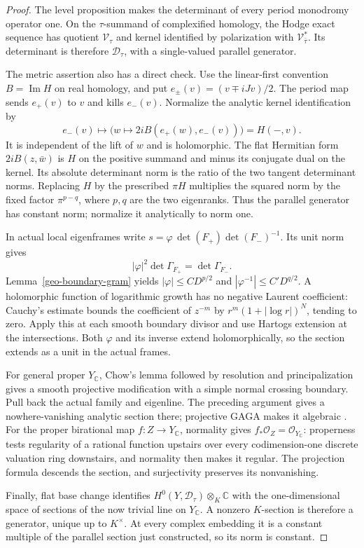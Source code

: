 \begin{proof}
The level proposition makes the determinant of every period
monodromy operator one. On the $\tau$-summand of complexified
homology, the Hodge exact sequence has quotient $\mathcal V_\tau$
and kernel identified by polarization with
$\mathcal V_{\bar\tau}^*$. Its determinant is therefore
$\mathcal D_\tau$, with a single-valued parallel generator.

The metric assertion also has a direct check. Use the
linear-first convention $B=\operatorname{Im}H$ on real homology,
and put $e_\pm(v)=(v\mp iJv)/2$. The period map sends $e_+(v)$
to $v$ and kills $e_-(v)$. Normalize the analytic kernel
identification by
\[
 e_-(v)\longmapsto
       \bigl(w\longmapsto 2iB(e_+(w),e_-(v))\bigr)=H(-,v).
\]
It is independent of the lift of $w$ and is holomorphic.
The flat Hermitian form $2iB(z,\bar w)$ is $H$ on the
positive summand and minus its conjugate dual on the kernel.
Its absolute determinant norm is the ratio of the two tangent
determinant norms. Replacing $H$ by the prescribed $\pi H$
multiplies the squared norm by the fixed factor $\pi^{p-q}$,
where $p,q$ are the two eigenranks. Thus the parallel generator
has constant norm; normalize it analytically to norm one.

In actual local eigenframes write
$s=\varphi\,\det(F_+)\det(F_-)^{-1}$. Its unit norm gives
\[
       |\varphi|^2\det\Gamma_{F_+}=\det\Gamma_{F_-}.
\]
Lemma~\ref{geo-boundary-gram} yields
$|\varphi|\le C D^{p/2}$ and
$|\varphi^{-1}|\le C'D^{q/2}$.
A holomorphic function of logarithmic growth has no negative
Laurent coefficient: Cauchy's estimate bounds the coefficient
of $z^{-m}$ by $r^m(1+|\log r|)^N$, tending to zero.
Apply this at each smooth boundary divisor and use Hartogs
extension at the intersections. Both $\varphi$ and its inverse
extend holomorphically, so the section extends as a unit in the
actual frames.

For general proper $Y_{\mathbb C}$, Chow's lemma followed by
resolution and principalization gives a smooth projective
modification with a simple normal crossing boundary.
Pull back the actual family and eigenline. The preceding
argument gives a nowhere-vanishing analytic section there;
projective GAGA makes it algebraic
\cite[Theorems 1.0.1 and 1.0.3]{WlodarczykResolution}
\cite[\S12, Theorem 1]{SerreGAGA}.
For the proper birational map $f:Z\to Y_{\mathbb C}$,
normality gives $f_*\mathcal O_Z=\mathcal O_{Y_{\mathbb C}}$:
properness tests regularity of a rational function upstairs
over every codimension-one discrete valuation ring downstairs,
and normality then makes it regular. The projection formula
descends the section, and surjectivity preserves its
nonvanishing.

Finally, flat base change identifies
$H^0(Y,\mathcal D_\tau)\otimes_K\mathbb C$ with the
one-dimensional space of sections of the now trivial line
on $Y_{\mathbb C}$. A nonzero $K$-section is therefore a
generator, unique up to $K^\times$. At every complex embedding
it is a constant multiple of the parallel section just
constructed, so its norm is constant.
\end{proof}
